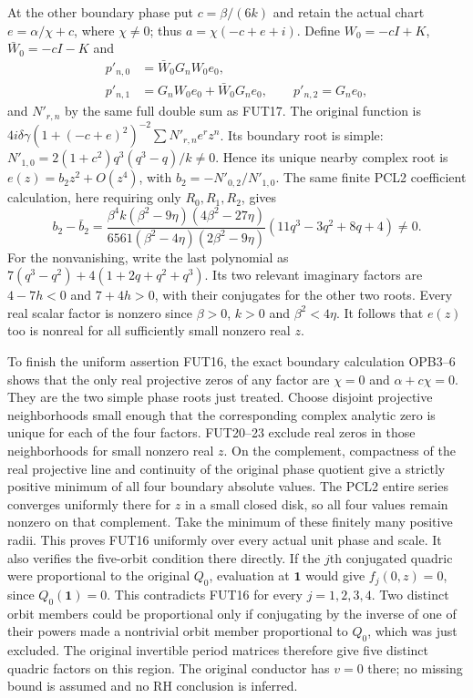 \documentclass[11pt]{article}
\begin{document}
At the other boundary phase put $c=\beta/(6k)$ and retain the actual
chart $e=\alpha/\chi+c$, where $\chi\ne0$; thus
$a=\chi(-c+e+i)$. Define $W_0=-cI+K$, $\bar W_0=-cI-K$ and
\[
 \begin{split}
 p'_{n,0}&=\bar W_0G_nW_0e_0,\\
 p'_{n,1}&=G_nW_0e_0+\bar W_0G_ne_0,\qquad
 p'_{n,2}=G_ne_0,
 \end{split}\tag{FUT22}
\]
and $N'_{r,n}$ by the same full double sum as FUT17.
The original function is
$4i\delta\gamma(1+(-c+e)^2)^{-2}\sum N'_{r,n}e^rz^n$.
Its boundary root is simple:
$N'_{1,0}=2(1+c^2)q^3(q^3-q)/k\ne0$.
Hence its unique nearby complex root is
$e(z)=b_2z^2+O(z^4)$, with $b_2=-N'_{0,2}/N'_{1,0}$.
The same finite PCL2 coefficient calculation, here requiring only
$R_0,R_1,R_2$, gives
\[
 b_2-\bar b_2=
 \frac{\beta^4k(\beta^2-9\eta)(4\beta^2-27\eta)}
      {6561(\beta^2-4\eta)(2\beta^2-9\eta)}
       (11q^3-3q^2+8q+4)\ne0.
 \tag{FUT23}
\]
For the nonvanishing, write the last polynomial as
$7(q^3-q^2)+4(1+2q+q^2+q^3)$.
Its two relevant imaginary factors are $4-7h<0$ and $7+4h>0$,
with their conjugates for the other two roots. Every real scalar
factor is nonzero since $\beta>0$, $k>0$ and $\beta^2<4\eta$.
It follows that $e(z)$ too is nonreal for all sufficiently small
nonzero real $z$.

To finish the uniform assertion FUT16, the exact boundary calculation
OPB3--6 shows that the only real projective zeros of any factor are
$\chi=0$ and $\alpha+c\chi=0$. They are the two simple phase roots
just treated. Choose disjoint projective neighborhoods small enough
that the corresponding complex analytic zero is unique for each of
the four factors. FUT20--23 exclude real zeros in those neighborhoods
for small nonzero real $z$. On the complement, compactness of the
real projective line and continuity of the original phase quotient
give a strictly positive minimum of all four boundary absolute values.
The PCL2 entire series converges uniformly there for $z$ in a small
closed disk, so all four values remain nonzero on that complement.
Take the minimum of these finitely many positive radii.
This proves FUT16 uniformly over every actual unit phase and scale.
It also verifies the five-orbit condition there directly. If the
$j$th conjugated quadric were proportional to the original $Q_0$,
evaluation at $\boldsymbol1$ would give $f_j(0,z)=0$, since
$Q_0(\boldsymbol1)=0$. This contradicts FUT16 for every $j=1,2,3,4$.
Two distinct orbit members could be proportional only if conjugating
by the inverse of one of their powers made a nontrivial orbit member
proportional to $Q_0$, which was just excluded. The original invertible
period matrices therefore give five distinct quadric factors on this
region. The original conductor has $v=0$ there; no missing bound is
assumed and no RH conclusion is inferred.
\end{document}
